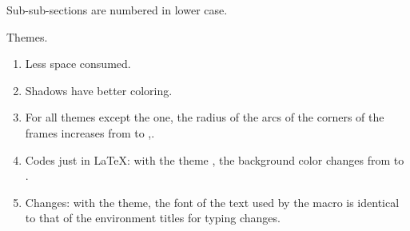 \documentclass{tutodoc}
\begin{document}
\begin{tdocupdate}
	\item Sub-sub-sections are numbered in lower case.

	\item Themes.
	\begin{enumerate}
		\item Less space consumed.

		\item Shadows have better coloring.

		\item For all themes except the  one, the radius of the arcs of the corners of the frames increases from \tdoclatexin{.75mm} to \tdoclatexin{.2pt},.

 		\item Codes just in \LaTeX: with the theme , the background color changes from  to .

		\item Changes: with the  theme, the font of the \tdoclatexin{[Init]} text used by the  macro is identical to that of the environment titles for typing changes.
	\end{enumerate}
\end{tdocupdate}
\end{document}
